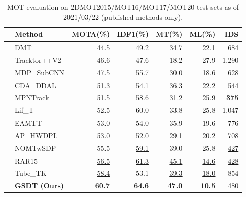 \documentclass[letterpaper, 10 pt, conference]{ieeeconf}
\renewcommand\bf[1]{\textbf{#1}}
\newcommand\ul[1]{\underline{#1}}
\newcommand\uul[1]{\underline{\underline{#1}}}
\begin{document}
\begin{table}[t]
\vspace{1.5mm}
\setlength\tabcolsep{2pt}
\centering
\caption{MOT evaluation on 2DMOT2015/MOT16/MOT17/MOT20 test sets as of 2021/03/22 (published methods only).}
\vspace{-0.35cm}
\begin{tabular}{@{}llrrrrr@{}}
\toprule
& Method & MOTA(\%) & IDF1(\%) & MT(\%) & ML(\%) & IDS\\
\midrule

\parbox{2mm}{} 
& DMT \cite{B2016} & 44.5 & 49.2 & 34.7 & 22.1 & 684 \\
& Tracktor++V2 \cite{Bergmann2019} & 46.6 & 47.6 & 18.2 & 27.9 & 1,290 \\
& MDP\_SubCNN \cite{Xiang2015} & 47.5 & 55.7 & 30.0 & 18.6 & 628 \\
& CDA\_DDAL \cite{Bae2018} & 51.3 & 54.1 & 36.3 & 22.2 & 544 \\
& MPNTrack \cite{Braso2020} & 51.5 & 58.6 & 31.2 & 25.9 & \textbf{375} \\
& Lif\_T \cite{Hornakova2020} & 52.5 & 60.0 & 33.8 & 25.8 & 1,047 \\
& EAMTT \cite{Matilla2016} & 53.0 & 54.0 & 35.9 & 19.6 & 776 \\
& AP\_HWDPL \cite{aphdwpl} & 53.0 & 52.0 & 29.1 & 20.2 & 708 \\
& NOMTwSDP \cite{Choi2015} & 55.5 & \uul{59.1} & 39.0 & 25.8 & \ul{427} \\
& RAR15 \cite{Fang2018} & \uul{56.5} & \ul{61.3} & \ul{45.1} & \ul{14.6} & \uul{428} \\
& Tube\_TK \cite{pang2020tubetk} & \ul{58.4} & 53.1 & \uul{39.3} & \uul{18.0} & 854 \\
& \textbf{GSDT (Ours)}                   & \bf{60.7}   & \bf{64.6}  & \bf{47.0}     & \bf{10.5} & 480 \\
\midrule


\end{tabular}
\end{table}
\end{document}
